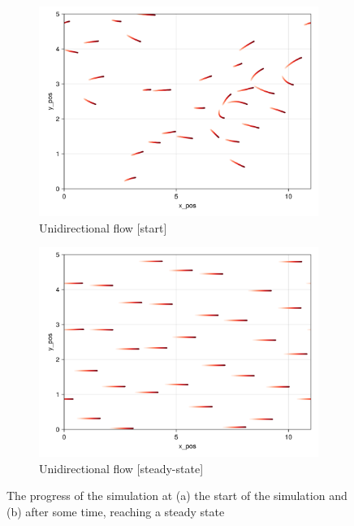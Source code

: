\begin{figure}[H]
    \centering
    \begin{subfigure}{.49\textwidth}
        \centering
        \includegraphics[width=\linewidth]{figures/ch4_uniflow/Uniflowdflow_101.png}
        \caption{Unidirectional flow [start]}
    \end{subfigure}
    \begin{subfigure}{.49\textwidth}
        \centering
        \includegraphics[width=\linewidth]{figures/ch4_uniflow/Uniflowdflow_4000.png}
        \caption{Unidirectional flow [steady-state]}
    \end{subfigure}
    \caption{The progress of the simulation at (a) the start of the simulation and (b) after some time, reaching a steady state}
    \label{plot:uniflow_positions}
\end{figure}


